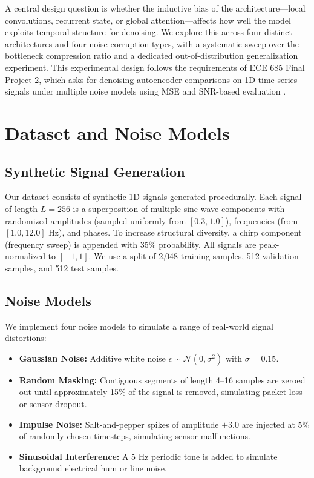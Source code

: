 \documentclass{article}
\begin{document}
A central design question is whether the inductive bias of the architecture---local
convolutions, recurrent state, or global attention---affects how well the model exploits
temporal structure for denoising. We explore this across four distinct architectures and
four noise corruption types, with a systematic sweep over the bottleneck compression
ratio and a dedicated out-of-distribution generalization experiment. This experimental
design follows the requirements of ECE 685 Final Project 2, which asks for denoising
autoencoder comparisons on 1D time-series signals under multiple noise models using MSE
and SNR-based evaluation \citep{ece685_project_handout}.

\section{Dataset and Noise Models}

\subsection{Synthetic Signal Generation}

Our dataset consists of synthetic 1D signals generated procedurally. Each signal of
length $L = 256$ is a superposition of multiple sine wave components with randomized
amplitudes (sampled uniformly from $[0.3, 1.0]$), frequencies (from $[1.0, 12.0]$ Hz),
and phases. To increase structural diversity, a chirp component (frequency sweep) is
appended with 35\% probability. All signals are peak-normalized to $[-1, 1]$. We use a
split of 2{,}048 training samples, 512 validation samples, and 512 test samples.

\subsection{Noise Models}

We implement four noise models to simulate a range of real-world signal distortions:

\begin{itemize}
    \item \textbf{Gaussian Noise:} Additive white noise $\epsilon \sim \mathcal{N}(0, \sigma^{2})$
          with $\sigma = 0.15$.
    \item \textbf{Random Masking:} Contiguous segments of length 4--16 samples are zeroed out
          until approximately 15\% of the signal is removed, simulating packet loss or sensor
          dropout.
    \item \textbf{Impulse Noise:} Salt-and-pepper spikes of amplitude $\pm 3.0$ are injected at
          5\% of randomly chosen timesteps, simulating sensor malfunctions.
    \item \textbf{Sinusoidal Interference:} A 5 Hz periodic tone is added to simulate background
          electrical hum or line noise.
\end{itemize}
\end{document}
